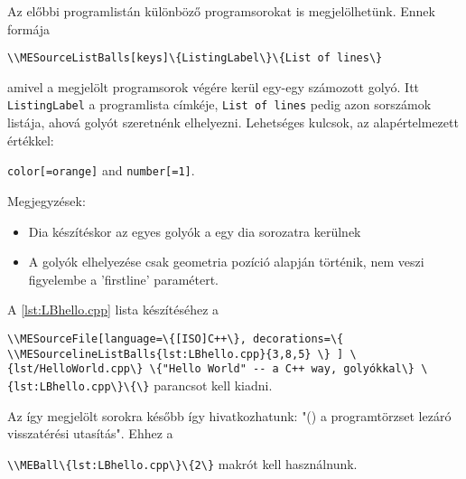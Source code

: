 {
Az előbbi programlistán különböző programsorokat is megjelölhetünk.
Ennek formája 
\par\noindent\lstinline|\\MESourceListBalls[keys]\{ListingLabel\}\{List of lines\}|
\par\noindent amivel a megjelölt programsorok végére kerül egy-egy számozott golyó.
Itt \lstinline|ListingLabel| a programlista címkéje, \lstinline|List of lines|
pedig azon sorszámok listája, ahová golyót szeretnénk elhelyezni.
Lehetséges kulcsok, az alapértelmezett értékkel:
\par\noindent\lstinline|color[=orange]| and \lstinline|number[=1]|. 


Megjegyzések:
\begin{itemize}
\item Dia készítéskor az egyes golyók a egy dia sorozatra kerülnek
\item A golyók elhelyezése csak geometria pozíció alapján történik, nem veszi figyelembe
a 'firstline' paramétert.
\end{itemize}

A \ref{lst:LBhello.cpp} lista készítéséhez a
\par\noindent\lstinline|\\MESourceFile[language=\{[ISO]C++\},
decorations=\{
\\MESourcelineListBalls{lst:LBhello.cpp}{3,8,5}
\}
] \{lst/HelloWorld.cpp\} \{"Hello World" -- a C++ way, golyókkal\} \{lst:LBhello.cpp\}\{\}|
parancsot kell kiadni.


Az így megjelölt sorokra később így hivatkozhatunk: "()
a programtörzset lezáró visszatérési utasítás".
Ehhez a 
\par\noindent\lstinline|\\MEBall\{lst:LBhello.cpp\}\{2\}| makrót kell használnunk.

}



